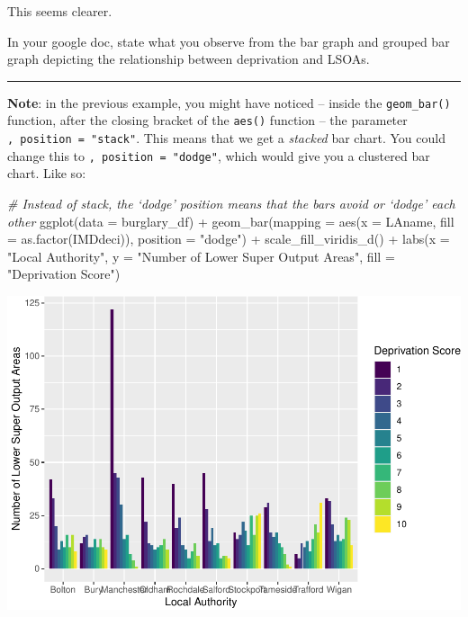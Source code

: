 \documentclass[
]{book}
\newenvironment{Shaded}{\begin{snugshade}}{\end{snugshade}}
\newcommand{\AttributeTok}[1]{\textcolor[rgb]{0.77,0.63,0.00}{#1}}
\newcommand{\CommentTok}[1]{\textcolor[rgb]{0.56,0.35,0.01}{\textit{#1}}}
\newcommand{\FunctionTok}[1]{\textcolor[rgb]{0.00,0.00,0.00}{#1}}
\newcommand{\NormalTok}[1]{#1}
\newcommand{\SpecialCharTok}[1]{\textcolor[rgb]{0.00,0.00,0.00}{#1}}
\newcommand{\StringTok}[1]{\textcolor[rgb]{0.31,0.60,0.02}{#1}}
\begin{document}
This seems clearer.

In your google doc, state what you observe from the bar graph and grouped bar graph depicting the relationship between deprivation and LSOAs.

\begin{center}\rule{0.5\linewidth}{0.5pt}\end{center}

\textbf{Note}: in the previous example, you might have noticed -- inside the \texttt{geom\_bar()} function, after the closing bracket of the \texttt{aes()} function -- the parameter \texttt{,\ position\ =\ "stack"}. This means that we get a \emph{stacked} bar chart. You could change this to \texttt{,\ position\ =\ "dodge"}, which would give you a clustered bar chart. Like so:

\begin{Shaded}
\begin{Highlighting}[]
\CommentTok{\# Instead of stack, the ‘dodge’ position means that the bars avoid or ‘dodge’ each other}
\FunctionTok{ggplot}\NormalTok{(}\AttributeTok{data =}\NormalTok{ burglary\_df) }\SpecialCharTok{+} 
  \FunctionTok{geom\_bar}\NormalTok{(}\AttributeTok{mapping =} \FunctionTok{aes}\NormalTok{(}\AttributeTok{x =}\NormalTok{ LAname, }\AttributeTok{fill =} \FunctionTok{as.factor}\NormalTok{(IMDdeci)), }\AttributeTok{position =} \StringTok{"dodge"}\NormalTok{) }\SpecialCharTok{+}
  \FunctionTok{scale\_fill\_viridis\_d}\NormalTok{() }\SpecialCharTok{+} 
  \FunctionTok{labs}\NormalTok{(}\AttributeTok{x =} \StringTok{"Local Authority"}\NormalTok{, }\AttributeTok{y =} \StringTok{"Number of Lower Super Output Areas"}\NormalTok{, }\AttributeTok{fill =} \StringTok{"Deprivation Score"}\NormalTok{)}
\end{Highlighting}
\end{Shaded}

\includegraphics{03-data-visualisation_files/figure-latex/unnamed-chunk-16-1.pdf}
\end{document}
